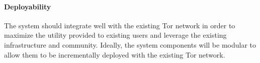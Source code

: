 \paragraph{Deployability} The system should integrate well with the existing Tor
network in order to maximize the utility provided to existing users and leverage
the existing infrastructure and community. Ideally, the system components will
be modular to allow them to be incrementally deployed with the existing Tor
network.

%
%
%
%
%
%
